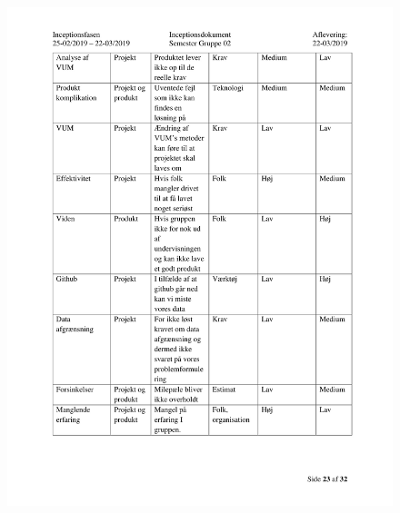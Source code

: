 \begin{figure}[hb]
  \includegraphics[scale = 0.33]{./PNG/Inceptions/Gruppe 02 + InceptionsDokument-24.jpg} 
\end{figure}

